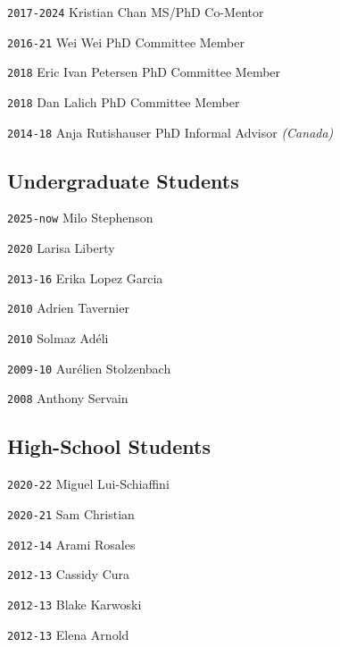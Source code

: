 \noindent \texttt{2017-2024} \tab Kristian Chan \tab MS/PhD Co-Mentor

\noindent \texttt{2016-21} \tab Wei Wei \tab PhD Committee Member

\noindent \texttt{2018} \tab Eric Ivan Petersen  \tab PhD Committee Member

\noindent \texttt{2018} \tab Dan Lalich \tab PhD Committee Member

\noindent \texttt{2014-18} \tab Anja Rutishauser \tab PhD Informal Advisor \textit{(Canada)}


\vspace{-1em}
\subsection*{Undergraduate Students}

\noindent \texttt{2025-now} \tab Milo Stephenson

\noindent \texttt{2020} \tab Larisa Liberty

\noindent \texttt{2013-16} \tab Erika Lopez Garcia

\noindent \texttt{2010} \tab Adrien Tavernier

\noindent \texttt{2010} \tab Solmaz Adéli

\noindent \texttt{2009-10} \tab Aurélien Stolzenbach

\noindent \texttt{2008} \tab Anthony Servain

\vspace{-1em}
\subsection*{High-School Students}

\noindent \texttt{2020-22} \tab Miguel Lui-Schiaffini

\noindent \texttt{2020-21} \tab Sam Christian

\noindent \texttt{2012-14} \tab Arami Rosales

\noindent \texttt{2012-13} \tab Cassidy Cura

\noindent \texttt{2012-13} \tab Blake Karwoski

\noindent \texttt{2012-13} \tab Elena Arnold

